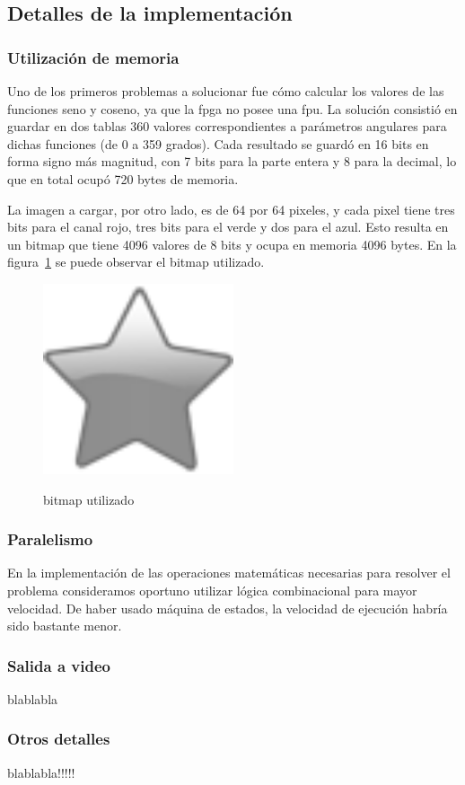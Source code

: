 \subsection{Detalles de la implementación}
\subsubsection{Utilización de memoria}
Uno de los primeros problemas a solucionar fue cómo calcular los valores de las funciones seno y coseno, ya que la fpga no posee una fpu. La solución consistió en guardar en dos tablas $360$ valores correspondientes a parámetros angulares para dichas funciones (de 0 a 359 grados). Cada resultado se guardó en 16 bits en forma signo más magnitud, con 7 bits para la parte entera y 8 para la decimal, lo que en total ocupó 720 bytes de memoria.
\par La imagen a cargar, por otro lado, es de 64 por 64 pixeles, y cada pixel tiene tres bits para el canal rojo, tres bits para el verde y dos para el azul. Esto resulta en un bitmap que tiene 4096 valores de 8 bits y ocupa en memoria 4096 bytes. En la figura~\ref{fig:chess} se puede observar el bitmap utilizado. 

\begin{figure}[h!]
 \caption{bitmap utilizado}
 \centering
   \includegraphics[width=0.5\textwidth]{bitmap.png}
   \label{fig:chess}
\end{figure}   

\subsubsection{Paralelismo}
En la implementación de las operaciones matemáticas necesarias para resolver el problema consideramos oportuno utilizar lógica combinacional para mayor velocidad. De haber usado máquina de estados, la velocidad de ejecución habría sido bastante menor.

\subsubsection{Salida a video}
blablabla

\subsubsection{Otros detalles}

blablabla!!!!!